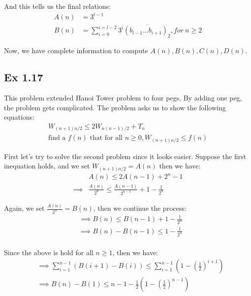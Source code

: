 \documentclass{article}
\begin{document}
And this tells us the final relations:
\begin{equation}
    \begin{split}
    A(n) & = 3^{l-1}\\
    B(n) & = \sum_{i=0}^{i=l-2}3^{i}\overline{(b_{l-1}\dots b_{i+1})_2}, for \ n \ge 2
    \end{split}
\end{equation}

Now, we have complete information to compute $A(n), B(n), C(n), D(n)$.

\subsection{Ex 1.17}

This problem extended Hanoi Tower problem to four pegs. By adding one peg, the problem gets complicated. The problem asks us to show the following equations:
\begin{equation}
    \begin{split}
        W_{(n+1)n/2} \le 2W_{n(n-1)/2} + T_n \\
        \text{find a }f(n) \text{ that for all }n \ge 0, W_{(n+1)n/2} \le f(n)
    \end{split}
\end{equation}

First let's try to solve the second problem since it looks easier. Suppose the first inequation holds, and we set $W_{(n+1)n/2} = A(n)$ then we have:
\begin{equation}
    \begin{split}
        &  A(n)  \le 2A(n-1) + 2^n - 1\\
      \implies &  \frac{A(n)}{2^n}  \le \frac{A(n-1)}{2^{n-1}} + 1 - \frac{1}{2^n}
    \end{split}
\end{equation}

Again, we set $\frac{A(n)}{2^n} = B(n)$, then we continue the process:
\begin{equation}
    \begin{split}
      & \implies B(n)  \le B(n-1) + 1 - \frac{1}{2^n}\\
      & \implies B(n) - B(n-1)  \le 1 - \frac{1}{2^n}\\
    \end{split}
\end{equation}

Since the above is hold for all $n \ge 1$, then we have:
\begin{equation}
    \begin{split}
        & \implies \sum_{i=1}^{n-1}(B(i+1)-B(i)) \le \sum_{i=1}^{n-1}(1-(\frac{1}{2})^{i+1})\\
        & \implies B(n) - B(1) \le n-1-\frac{1}{2}(1-(\frac{1}{2})^{n-1})
    \end{split}
\end{equation}
\end{document}

